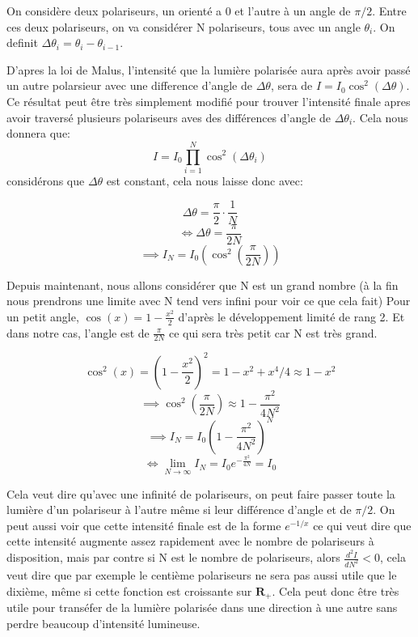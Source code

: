 \documentclass{article}
\begin{document}
On considère deux polariseurs, un orienté a 0 et l'autre à un angle de $ \pi/2 $. Entre ces deux polariseurs, on va considérer N polariseurs, tous avec un angle $ \theta_i $. On definit $ \Delta\theta_i = \theta_i - \theta_{i-1} $.
\newline

D'apres la loi de Malus, l'intensité que la lumière polarisée aura après avoir passé un autre polarsieur avec une difference d'angle de $ \Delta\theta $, sera de $ I = I_0 \cos^2(\Delta\theta) $. Ce résultat peut être très simplement modifié pour trouver l'intensité finale apres avoir traversé plusieurs polariseurs aves des différences d'angle de $ \Delta\theta_i $. Cela nous donnera que:
$$ I = I_0 \prod_{i = 1}^{N} \cos^2(\Delta\theta_i) $$
considérons que $ \Delta\theta $ est constant, cela nous laisse donc avec:

$$ \Delta\theta = \frac{\pi}{2} \cdot \frac{1}{N} $$
$$ \iff \Delta\theta = \frac{\pi}{2N} $$
$$ \implies I_N = I_0(\cos^2(\frac{\pi}{2N})) $$

Depuis maintenant, nous allons considérer que N est un grand nombre (à la fin nous prendrons une limite avec N tend vers infini pour voir ce que cela fait)
Pour un petit angle, $ \cos(x) = 1 - \frac{x^2}{2} $ d'après le développement limité de rang 2. Et dans notre cas, l'angle est de $ \frac{\pi}{2N} $ ce qui sera très petit car N est très grand.

$$ \cos^2(x) = (1 - \frac{x^2}{2})^2 = 1 - x^2 + x^4/4 \approx 1 - x^2 $$
$$ \implies \cos^2(\frac{\pi}{2N}) \approx 1 - \frac{\pi^2}{4N^2} $$
$$ \implies I_N = I_0(1 - \frac{\pi^2}{4N^2})^N $$
$$ \iff \lim_{N\to\infty} I_N = I_0 e^{-\frac{\pi^2}{4N}} = I_0 $$

Cela veut dire qu'avec une infinité de polariseurs, on peut faire passer toute la lumière d'un polariseur à l'autre même si leur différence d'angle et de $ \pi/2 $. On peut aussi voir que cette intensité finale est de la forme $ e^{-1/x} $ ce qui veut dire que cette intensité augmente assez rapidement avec le nombre de polariseurs à disposition, mais par contre si N est le nombre de polariseurs, alors $ \frac{d^2I}{dN^2} < 0 $, cela veut dire que par exemple le centième polariseurs ne sera pas aussi utile que le dixième, même si cette fonction est croissante sur $ \mathbf{R}_+ $. Cela peut donc être très utile pour transéfer de la lumière polarisée dans une direction à une autre sans perdre beaucoup d'intensité lumineuse.
\end{document}
